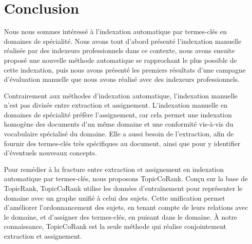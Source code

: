 
  \section{Conclusion}
  \label{sec:main-domain_specific_keyphrase_annotation-conclusion}
    Nous nous sommes intéressé à l'indexation automatique par termes-clés en
    domaines de spécialité. Nous avons tout d'abord présenté l'indexation
    manuelle réalisée par des indexeurs professionnels dans ce contexte, nous
    avons ensuite proposé une nouvelle méthode automatique se rapprochant le
    plus possible de cette indexation, puis nous avons présenté les premiers
    résultats d'une campagne d'évaluation manuelle que nous avons réalisé avec
    des indexeurs professionnels.

    Contrairement aux méthodes d'indexation automatique, l'indexation manuelle
    n'est pas divisée entre extraction et assignement. L'indexation manuelle en
    domaines de spécialité préfère l'assignement, car cela permet une
    indexation homogène des documents d'un même domaine et une conformité
    vis-à-vis du vocabulaire spécialisé du domaine. Elle a aussi besoin de
    l'extraction, afin de fournir des termes-clés très spécifiques au document,
    ainsi que pour y identifier d'éventuels nouveaux concepts.

    Pour remédier à la fracture entre extraction et assignement en indexation
    automatique par termes-clés, nous proposons TopicCoRank. Conçu sur la base
    de TopicRank, TopicCoRank utilise les données d'entraînement pour
    représenter le domaine avec un graphe unifié à celui des sujets. Cette
    unification permet d'améliorer l'ordonnancement des sujets, en tenant compte
    de leurs relations avec le domaine, et d'assigner des termes-clés, en
    puisant dans le domaine. À notre connaissance, TopicCoRank est la seule
    méthode qui réalise conjointement extraction et assignement.


